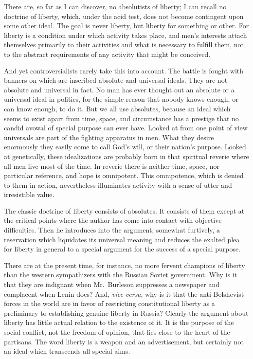 \documentclass[openany,nobib,nohyper]{tufte-book}
\begin{document}
There are, so far as I can discover, no absolutists of liberty; I can
recall no doctrine of liberty, which, under the acid test, does not
become contingent upon some other ideal. The goal is never liberty, but
liberty for something or other. For liberty is a condition under which
activity takes place, and men's interests attach themselves primarily to
their activities and what is necessary to fulfill them, not to the
abstract requirements of any activity that might be conceived.

And yet controversialists rarely take this into account. The battle is
fought with banners on which are inscribed absolute and universal
ideals. They are not absolute and universal in fact. No man has ever
thought out an absolute or a universal ideal in politics, for the simple
reason that nobody knows enough, or can know enough, to do it. But we
all use absolutes, because an ideal which seems to exist apart from
time, space, and circumstance has a prestige that no candid avowal of
special purpose can ever have. Looked at from one point of view
universals are part of the fighting apparatus in men. What they desire
enormously they easily come to call God's will, or their nation's
purpose. Looked at genetically, these idealizations are probably born in
that spiritual reverie where all men live most of the time. In reverie
there is neither time, space, nor particular reference, and hope is
omnipotent. This omnipotence, which is denied to them in action,
nevertheless illuminates activity with a sense of utter and irresistible
value.

The classic doctrine of liberty consists of absolutes. It consists of
them except at the critical points where the author has come into
contact with objective difficulties. Then he introduces into the
argument, somewhat furtively, a reservation which liquidates its
universal meaning and reduces the exalted plea for liberty in general to
a special argument for the success of a special purpose.

There are at the present time, for instance, no more fervent champions
of liberty than the western sympathizers with the Russian Soviet
government. Why is it that they are indignant when Mr.~Burleson
suppresses a newspaper and complacent when Lenin does? And, \emph{vice
versa}, why is it that the anti-Bolshevist forces in the world are in
favor of restricting constitutional liberty as a preliminary to
establishing genuine liberty in Russia? Clearly the argument about
liberty has little actual relation to the existence of it. It is the
purpose of the social conflict, not the freedom of opinion, that lies
close to the heart of the partisans. The word liberty is a weapon and an
advertisement, but certainly not an ideal which transcends all special
aims.
\end{document}
